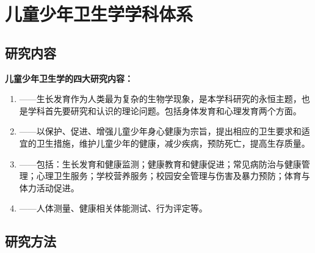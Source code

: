 \section{儿童少年卫生学学科体系}

\subsection{研究内容}

\begin{defbox}
\textbf{儿童少年卫生学的四大研究内容：}

\begin{enumerate}[leftmargin=*]
    \item {}——生长发育作为人类最为复杂的生物学现象，是本学科研究的永恒主题，也是学科首先要研究和认识的理论问题。包括身体发育和心理发育两个方面。

    \item {}——以保护、促进、增强儿童少年身心健康为宗旨，提出相应的卫生要求和适宜的卫生措施，维护儿童少年的健康，减少疾病，预防死亡，提高生存质量。

    \item {}——包括：生长发育和健康监测；健康教育和健康促进；常见病防治与健康管理；心理卫生服务；学校营养服务；校园安全管理与伤害及暴力预防；体育与体力活动促进。

    \item {}——人体测量、健康相关体能测试、行为评定等。
\end{enumerate}
\end{defbox}

\subsection{研究方法}

